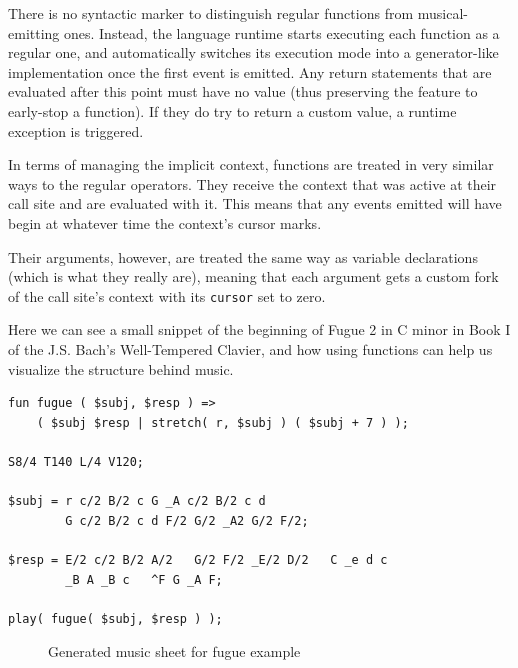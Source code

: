 \documentclass[a4paper,UKenglish,cleveref, autoref]{oasics-v2019}
\begin{document}
There is no syntactic marker to distinguish regular functions from musical-emitting ones. Instead, the language runtime starts executing each function as a regular one, and automatically switches its execution mode into a generator-like implementation once the first event is emitted. Any return statements that are evaluated after this point must have no value (thus preserving the feature to early-stop a function). If they do try to return a custom value, a runtime exception is triggered.

In terms of managing the implicit context, functions are treated in very similar ways to the regular operators. They receive the context that was active at their call site and are evaluated with it. This means that any events emitted will have begin at whatever time the context's cursor marks.

Their arguments, however, are treated the same way as variable declarations (which is what they really are), meaning that each argument gets a custom fork of the call site's context with its \texttt{cursor} set to zero.

Here we can see a small snippet of the beginning of Fugue 2 in C minor in Book I of the J.S. Bach’s Well-Tempered Clavier, and how using functions can help us visualize the structure behind music.

\begin{lstlisting}[caption={Example of repeating the same note},label=list:8-6,captionpos=t,abovecaptionskip=-\medskipamount]
fun fugue ( $subj, $resp ) => 
    ( $subj $resp | stretch( r, $subj ) ( $subj + 7 ) );

S8/4 T140 L/4 V120;

$subj = r c/2 B/2 c G _A c/2 B/2 c d
        G c/2 B/2 c d F/2 G/2 _A2 G/2 F/2;

$resp = E/2 c/2 B/2 A/2   G/2 F/2 _E/2 D/2   C _e d c
        _B A _B c   ^F G _A F;

play( fugue( $subj, $resp ) );
\end{lstlisting}


\begin{figure}[h]
  \centering
  {%
  \setlength{\fboxsep}{0pt}%
  \setlength{\fboxrule}{0pt}%
  }%
  \caption{Generated music sheet for fugue example}
  \label{fig:parallel}
\end{figure}
\end{document}

